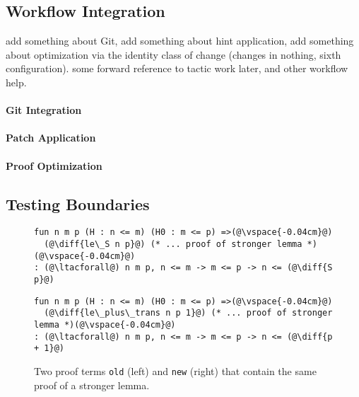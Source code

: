 \subsection{Workflow Integration}
\label{sec:workflow}

add something about Git, add something about hint application,
add something about optimization via the identity class of change (changes in nothing, sixth configuration).
some forward reference to tactic work later, and other workflow help.

\paragraph{Git Integration}

\paragraph{Patch Application}

\paragraph{Proof Optimization}

\subsection{Testing Boundaries}
\label{sec:eval}

\begin{figure*}[ht]
\begin{minipage}{0.48\textwidth}
\begin{lstlisting}[language=coq]
fun n m p (H : n <= m) (H0 : m <= p) =>(@\vspace{-0.04cm}@)
  (@\diff{le\_S n p}@) (* ... proof of stronger lemma *)(@\vspace{-0.04cm}@)
: (@\ltacforall@) n m p, n <= m -> m <= p -> n <= (@\diff{S p}@)
\end{lstlisting}
\end{minipage}
\hfill
\begin{minipage}{0.48\textwidth}
\begin{lstlisting}[language=coq]
fun n m p (H : n <= m) (H0 : m <= p) =>(@\vspace{-0.04cm}@)
  (@\diff{le\_plus\_trans n p 1}@) (* ... proof of stronger lemma *)(@\vspace{-0.04cm}@)
: (@\ltacforall@) n m p, n <= m -> m <= p -> n <= (@\diff{p + 1}@)
\end{lstlisting}
\end{minipage}
\vspace{-.35cm}
\caption{Two proof terms \lstinline{old} (left) and \lstinline{new} (right) that contain the same proof of a stronger lemma.}
\label{fig:stronger}
\end{figure*}

